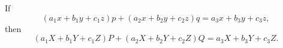 If
\[
(a_{1} x + b_{1} y + c_{1} z)p + (a_{2} x + b_{2} y + c_{2} z)q
  = a_{3} x + b_{3} y + c_{3} z,
\]
then
\[
(a_{1} X + b_{1} Y + c_{1} Z) P + (a_{2} X + b_{2} Y + c_{2} Z) Q
  = a_{3} X + b_{3} Y + c_{3} Z.
\]


